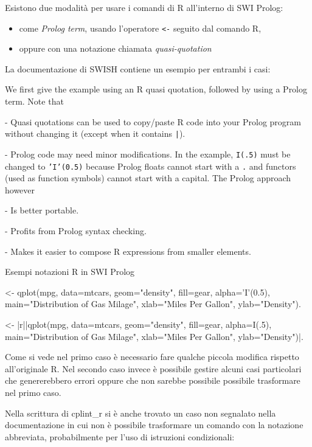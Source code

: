 \documentclass[10pt,titlepage,twoside,a4paper]{report}
\newenvironment{code}{\singlespacing\captionsetup{type=listing}}{}
\begin{document}
Esistono due modalità per usare i comandi di R all'interno di SWI Prolog:
\begin{itemize}
    \item come \emph{Prolog term}, usando l'operatore \texttt{<-} seguito dal 
comando R,
    \item oppure con una notazione chiamata \emph{quasi-quotation}
\end{itemize}
La documentazione di SWISH contiene un esempio per entrambi i 
casi\cite{rprolognotations}:
\begin{displayquote}
[..] We first give the example using an R quasi quotation, followed by 
using a Prolog term.  Note that

  - Quasi quotations can be used to copy/paste R code into your Prolog
    program without changing it (except when it contains \texttt{|{\textbraceright}}).

  - Prolog code may need minor modifications.  In the example, \texttt{I(.5)}
    must be changed to \texttt{'I'(0.5)} because Prolog floats cannot start with
    a \texttt{.} and functors (used as function symbols) cannot start with a
    capital.  The Prolog approach however

    - Is better portable.

    - Profits from Prolog syntax checking.

    - Makes it easier to compose R expressions from smaller elements.
\end{displayquote}

\begin{code}
    \caption{Esempi notazioni R in SWI Prolog}
    \begin{prologcode*}{}
<- qplot(mpg, data=mtcars, geom="density", fill=gear, alpha='I'(0.5), main="Distribution of Gas Milage", xlab="Miles Per Gallon", ylab="Density").

<- {|r||qplot(mpg, data=mtcars, geom="density", fill=gear, alpha=I(.5), main="Distribution of Gas Milage", xlab="Miles Per Gallon", ylab="Density")|}.
    \end{prologcode*}
\end{code}

Come si vede nel primo caso è necessario fare qualche piccola modifica 
rispetto all'originale R. Nel secondo caso invece è possibile gestire alcuni 
casi particolari che genererebbero errori oppure che non sarebbe possibile 
possibile trasformare nel primo caso.

Nella scrittura di cplint\_r si è anche trovato un caso non segnalato nella 
documentazione in cui non è possibile trasformare un comando con la 
notazione abbreviata, probabilmente per l'uso di istruzioni condizionali:
\end{document}
